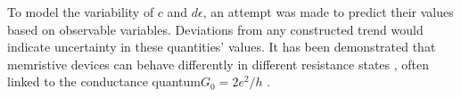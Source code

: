 
\noindent To model the variability of $c$ and $d\epsilon$, an attempt was made to predict their values based on observable variables. Deviations from any constructed trend would indicate uncertainty in these quantities' values. It has been demonstrated that memristive devices can behave differently in different resistance states \cite{mehonic2015structural}, often linked to the conductance quantum$G_0 = 2e^2/h$ \cite{yi2016quantized}.\\





